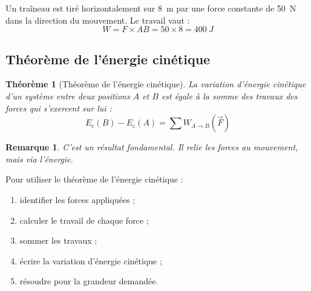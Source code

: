 \documentclass[11pt,a4paper]{article}
\newtheorem{theoreme}{Théorème}[section]
\newtheorem{remarque}{Remarque}[section]
\newcommand{\Ec}{E_\mathrm{c}}
\begin{document}
\begin{center}
\end{center}

\begin{applicationbox}
Un traîneau est tiré horizontalement sur \SI{8}{m} par une force constante de \SI{50}{N} dans la direction du mouvement.  
Le travail vaut :
\[
W = F\times AB = 50\times 8 = 400\ \si{J}
\]
\end{applicationbox}

\subsection{Théorème de l'énergie cinétique}

\begin{theoreme}[Théorème de l'énergie cinétique]
La variation d'énergie cinétique d'un système entre deux positions $A$ et $B$ est égale à la somme des travaux des forces qui s'exercent sur lui :
\[
\Ec(B)-\Ec(A)=\sum W_{A\to B}(\vec{F})
\]
\end{theoreme}

\begin{remarque}
C'est un résultat fondamental. Il relie les forces au mouvement, mais via l'énergie.
\end{remarque}

\begin{methodebox}
Pour utiliser le théorème de l'énergie cinétique :
\begin{enumerate}
    \item identifier les forces appliquées ;
    \item calculer le travail de chaque force ;
    \item sommer les travaux ;
    \item écrire la variation d'énergie cinétique ;
    \item résoudre pour la grandeur demandée.
\end{enumerate}
\end{methodebox}
\end{document}
